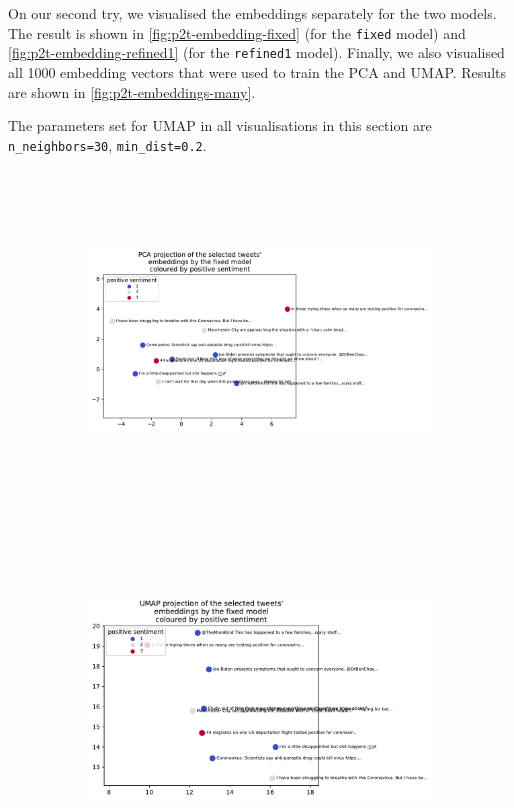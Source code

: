 On our second try, we visualised the embeddings separately for the two models. The result is shown in \cref{fig:p2t-embedding-fixed} (for the \texttt{fixed} model) and \cref{fig:p2t-embedding-refined1} (for the \texttt{refined1} model).
Finally, we also visualised all 1000 embedding vectors that were used to train the PCA and UMAP. Results are shown in \cref{fig:p2t-embeddings-many}.

The parameters set for UMAP in all visualisations in this section are \texttt{n\_neighbors=30}, \texttt{min\_dist=0.2}.

\begin{figure}
    \centering
    \begin{subfigure}[t]{\textwidth}
        \hspace*{1.5cm}\includegraphics[height=9cm]{images/transformer_embedding_fixed_pca_positive.pdf}
        \caption{}\label{fig:p2t-embedding-fixed-pca}
    \end{subfigure}
    \begin{subfigure}[t]{\textwidth}
        \hspace*{1.5cm}\includegraphics[height=9cm]{images/transformer_embedding_fixed_umap_positive.pdf}

\end{subfigure}
\end{figure}
